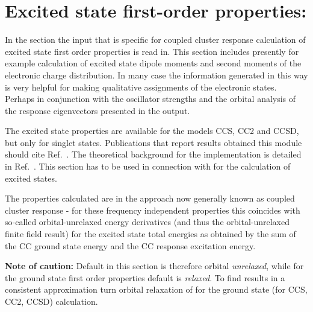 
\section{Excited state first-order properties: }\label{sec:ccexgr}

In the  section the input that is specific for coupled cluster 
response calculation of excited state first order properties is read in.
This section includes presently for example calculation of excited state 
dipole moments and second moments of the electronic charge distribution.
In many case the information generated in this way is very helpful 
for making qualitative assignments of the electronic states.
Perhaps in conjunction with the oscillator strengths and the 
orbital analysis of the response eigenvectors presented in the output.

The excited state properties are available for the models CCS, CC2 and CCSD,
but only for singlet states.
Publications that report results obtained this module should cite Ref.\ \cite{Christiansen:CCLR}.
The theoretical background for the implementation is detailed in Ref.\ \cite{Christiansen:QEL}.
This section has to be used in connection with  for the calculation of excited states.

The properties calculated are in the approach now generally known as coupled cluster
response - for these frequency independent properties this coincides with so-called
orbital-unrelaxed energy derivatives (and thus the orbital-unrelaxed finite field result)
for the excited state total energies as obtained by the sum of the CC ground state energy
and the CC response excitation energy.

{\bf Note of caution:}
Default in this section is therefore orbital {\it unrelaxed}, while for the ground state 
first order properties  default is {\it relaxed}. 
To find results in a consistent approximation turn orbital relaxation of
for the ground state (for CCS, CC2, CCSD) calculation.

